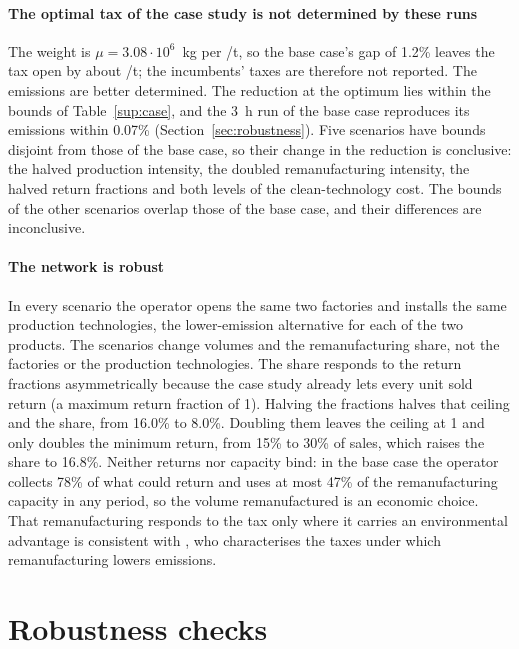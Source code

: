 \documentclass[11pt]{article}
\theoremstyle{remark}
\newcommand{\EUR}{\texteuro}
\begin{document}
\paragraph{The optimal tax of the case study is not determined by these runs} The weight is $\mu = 3.08\cdot10^{6}$~kg per \EUR/t, so the base case's gap of 1.2\% leaves the tax open by about \EUR125/t; the incumbents' taxes are therefore not reported. The emissions are better determined. The reduction at the optimum lies within the bounds of Table~\ref{sup:case}, and the 3~h run of the base case reproduces its emissions within 0.07\% (Section~\ref{sec:robustness}). Five scenarios have bounds disjoint from those of the base case, so their change in the reduction is conclusive: the halved production intensity, the doubled remanufacturing intensity, the halved return fractions and both levels of the clean-technology cost. The bounds of the other scenarios overlap those of the base case, and their differences are inconclusive.

\paragraph{The network is robust} In every scenario the operator opens the same two factories and installs the same production technologies, the lower-emission alternative for each of the two products. The scenarios change volumes and the remanufacturing share, not the factories or the production technologies. The share responds to the return fractions asymmetrically because the case study already lets every unit sold return (a maximum return fraction of 1). Halving the fractions halves that ceiling and the share, from 16.0\% to 8.0\%. Doubling them leaves the ceiling at 1 and only doubles the minimum return, from 15\% to 30\% of sales, which raises the share to 16.8\%. Neither returns nor capacity bind: in the base case the operator collects 78\% of what could return and uses at most 47\% of the remanufacturing capacity in any period, so the volume remanufactured is an economic choice. That remanufacturing responds to the tax only where it carries an environmental advantage is consistent with \textcite{yenipazarli2016managing}, who characterises the taxes under which remanufacturing lowers emissions.


\section{Robustness checks}\label{sup:robustness}
\end{document}
